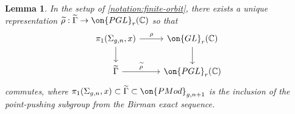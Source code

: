 \documentclass[12 pt]{amsart}
\theoremstyle{plain}
\newtheorem{lemma}[subsubsection]{Lemma}
\theoremstyle{definition}
\theoremstyle{remark}
\numberwithin{equation}{section}
\begin{document}
\begin{lemma}
	\label{lemma:mcg-rep-construction}
	In the setup of \autoref{notation:finite-orbit}, there exists a unique representation $\widetilde{\rho}:
	\widetilde{\Gamma} \to \on{PGL}_r(\mathbb C)$ so that
	\begin{equation}
		\label{equation:mcg-rho-and-tilde-rho-compatibility}
		\begin{tikzcd} 
			\pi_1(\Sigma_{g,n},x)  \ar[r, "\rho"] \ar {d} &
			 \on{GL}_r(\mathbb C) \ar {d} \\
			 \widetilde{\Gamma}  \ar [r, "\widetilde \rho"] & \on{PGL}_r(\mathbb C)
	\end{tikzcd}\end{equation}
	commutes,
	where $\pi_1(\Sigma_{g,n}, x) \subset\widetilde{\Gamma}\subset \on{PMod}_{g,n+1}$ is the inclusion
	of the point-pushing subgroup from the Birman exact sequence.
\end{lemma}
\end{document}
